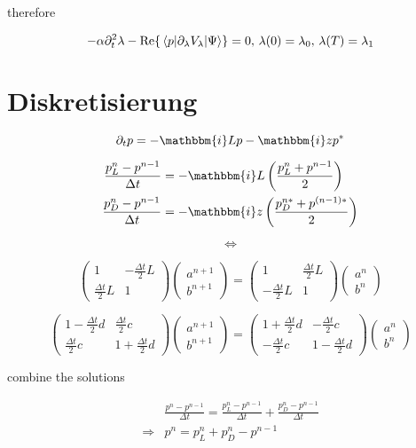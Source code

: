 \documentclass[10pt,a4paper]{article}
\newcommand{\iu}{\ensuremath{\mathbbm{i}}}
\newcommand{\An}{a^{n+1}}
\newcommand{\Aa}{a^n}
\newcommand{\Bn}{b^{n+1}}
\newcommand{\Ba}{b^n}
\begin{document}
therefore 

\begin{equation}
-\alpha \partial_t^2 \lambda - \Re{\mel{p}{\partial_{\lambda} V_{\lambda}}{\Psi}} = 0, \, \lambda(0)=\lambda_0, \, \lambda(T)=\lambda_1
\end{equation}


\section{Diskretisierung}

\begin{equation}
\partial_t p = -\iu L p -\iu z p^*
\end{equation}

\begin{align}
\frac{p_L^n-p^{n-1}}{\Delta t} &= -\iu L \left( \frac{p_L^n+p^{n-1}}{2} \right) \\
\frac{p_D^n-p^{n-1}}{\Delta t} &= -\iu z \left( \frac{p_D^{n*}+p^{(n-1)*}}{2} \right)
\end{align}

\begin{equation}
\Leftrightarrow
\end{equation}

\begin{equation}
\begin{pmatrix}
1 & -\frac{\Delta t}{2} L \\
\frac{\Delta t}{2} L & 1
\end{pmatrix}
\begin{pmatrix}
\An \\
\Bn 
\end{pmatrix}
=
\begin{pmatrix}
1 & \frac{\Delta t}{2} L \\
-\frac{\Delta t}{2} L & 1
\end{pmatrix}
\begin{pmatrix}
\Aa \\
\Ba 
\end{pmatrix}
\end{equation}

\begin{equation}
\begin{pmatrix}
1-\frac{\Delta t}{2} d & \frac{\Delta t}{2} c \\
\frac{\Delta t}{2} c & 1 + \frac{\Delta t}{2} d 
\end{pmatrix}
\begin{pmatrix}
\An \\
\Bn 
\end{pmatrix}
=
\begin{pmatrix}
1+\frac{\Delta t}{2} d & -\frac{\Delta t}{2} c \\
-\frac{\Delta t}{2} c & 1-\frac{\Delta t}{2} d
\end{pmatrix}
\begin{pmatrix}
\Aa \\
\Ba 
\end{pmatrix}
\end{equation}

combine the solutions

\begin{align}
&\frac{p^n-p^{n-1}}{\Delta t} = \frac{p_L^n-p^{n-1}}{\Delta t} + \frac{p_D^n-p^{n-1}}{\Delta t} \\
\Rightarrow& p^n = p_L^n + p_D^n - p^{n-1}
\end{align}
\end{document}
